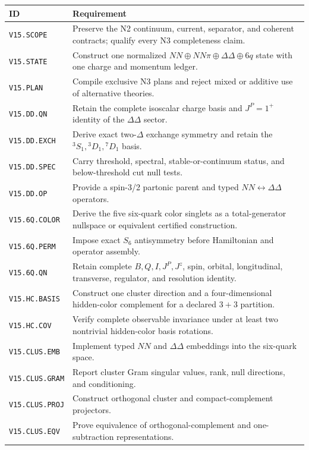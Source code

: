\documentclass[11pt]{article}
\begin{document}
{\small\begin{longtable}{L{0.23\textwidth}L{0.69\textwidth}}
\toprule
ID & Requirement \\
\midrule
\endhead
\texttt{V15.SCOPE} & Preserve the N2 continuum, current, separator, and coherent contracts; qualify every N3 completeness claim. \\
\texttt{V15.STATE} & Construct one normalized \(NN\oplus NN\pi\oplus\Delta\Delta\oplus6q\) state with one charge and momentum ledger. \\
\texttt{V15.PLAN} & Compile exclusive N3 plans and reject mixed or additive use of alternative theories. \\
\texttt{V15.DD.QN} & Retain the complete isoscalar charge basis and \(J^P=1^+\) identity of the \(\Delta\Delta\) sector. \\
\texttt{V15.DD.EXCH} & Derive exact two-\(\Delta\) exchange symmetry and retain the \({}^3S_1,{}^3D_1,{}^7D_1\) basis. \\
\texttt{V15.DD.SPEC} & Carry threshold, spectral, stable-or-continuum status, and below-threshold cut null tests. \\
\texttt{V15.DD.OP} & Provide a spin-3/2 partonic parent and typed \(NN\leftrightarrow\Delta\Delta\) operators. \\
\texttt{V15.6Q.COLOR} & Derive the five six-quark color singlets as a total-generator nullspace or equivalent certified construction. \\
\texttt{V15.6Q.PERM} & Impose exact \(S_6\) antisymmetry before Hamiltonian and operator assembly. \\
\texttt{V15.6Q.QN} & Retain complete \(B,Q,I,J^P,J^z\), spin, orbital, longitudinal, transverse, regulator, and resolution identity. \\
\texttt{V15.HC.BASIS} & Construct one cluster direction and a four-dimensional hidden-color complement for a declared \(3+3\) partition. \\
\texttt{V15.HC.COV} & Verify complete observable invariance under at least two nontrivial hidden-color basis rotations. \\
\texttt{V15.CLUS.EMB} & Implement typed \(NN\) and \(\Delta\Delta\) embeddings into the six-quark space. \\
\texttt{V15.CLUS.GRAM} & Report cluster Gram singular values, rank, null directions, and conditioning. \\
\texttt{V15.CLUS.PROJ} & Construct orthogonal cluster and compact-complement projectors. \\
\texttt{V15.CLUS.EQV} & Prove equivalence of orthogonal-complement and one-subtraction representations. \\

\end{longtable}}
\end{document}
